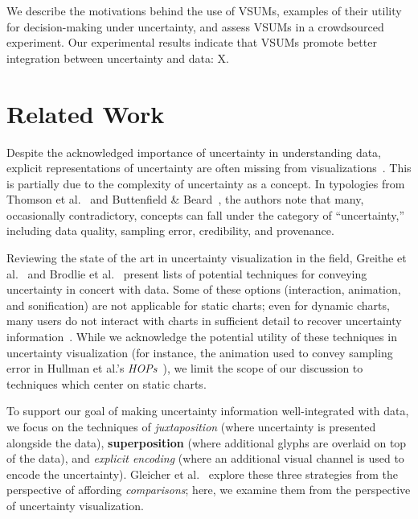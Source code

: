 \documentclass{vgtc}                          %
\begin{document}
We describe the motivations behind the use of VSUMs, examples of their utility for decision-making under uncertainty, and assess VSUMs in a crowdsourced experiment. Our experimental results indicate that VSUMs promote better integration between uncertainty and data: X.

\exampleFig
\section{Related Work}


Despite the acknowledged importance of uncertainty in understanding data, explicit representations of uncertainty are often missing from visualizations~\cite{boukhelifa2009uncertainty}. This is partially due to the complexity of uncertainty as a concept. In typologies from Thomson et al.~\cite{thomson2005typology} and Buttenfield \& Beard~\cite{buttenfield1994graphical}, the authors note that many, occasionally contradictory, concepts can fall under the category of ``uncertainty,'' including data quality, sampling error, credibility, and provenance.

Reviewing the state of the art in uncertainty visualization in the field, Greithe et al.~\cite{griethe2006visualization} and Brodlie et al.~\cite{brodlie2012review} present lists of potential techniques for conveying uncertainty in concert with data. Some of these options (interaction, animation, and sonification) are not applicable for static charts; even for dynamic charts, many users do not interact with charts in sufficient detail to recover uncertainty information~\cite{nyt2016}. While we acknowledge the potential utility of these techniques in uncertainty visualization (for instance, the animation used to convey sampling error in Hullman et al.'s \emph{HOPs}~\cite{hullman2015hypothetical}), we limit the scope of our discussion to techniques which center on static charts.

To support our goal of making uncertainty information well-integrated with data, we focus on the techniques of \emph{juxtaposition} (where uncertainty is presented alongside the data), \textbf{superposition} (where additional glyphs are overlaid on top of the data), and \emph{explicit encoding} (where an additional visual channel is used to encode the uncertainty). Gleicher et al.~\cite{gleicher2011visual} explore these three strategies from the perspective of affording \emph{comparisons}; here, we examine them from the perspective of uncertainty visualization.
\end{document}
